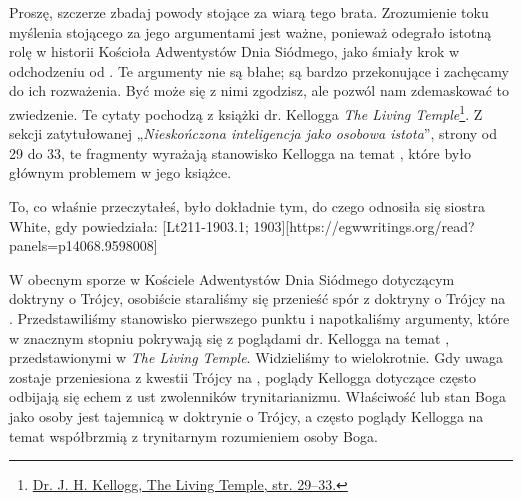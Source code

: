 Proszę, szczerze zbadaj powody stojące za wiarą tego brata. Zrozumienie toku myślenia stojącego za jego argumentami jest ważne, ponieważ odegrało istotną rolę w historii Kościoła Adwentystów Dnia Siódmego, jako śmiały krok w odchodzeniu od . Te argumenty nie są błahe; są bardzo przekonujące i zachęcamy do ich rozważenia. Być może się z nimi zgodzisz, ale pozwól nam zdemaskować to zwiedzenie. Te cytaty pochodzą z książki dr. Kellogga \textit{The Living Temple}\footnote{\href{https://archive.org/details/J.H.Kellogg.TheLivingTemple1903}{Dr. J. H. Kellogg, The Living Temple, str. 29--33.}}. Z sekcji zatytułowanej „\textit{Nieskończona inteligencja jako osobowa istota}”, strony od 29 do 33, te fragmenty wyrażają stanowisko Kellogga na temat , które było głównym problemem w jego książce.

To, co właśnie przeczytałeś, było dokładnie tym, do czego odnosiła się siostra White, gdy powiedziała: [Lt211-1903.1; 1903][https://egwwritings.org/read?panels=p14068.9598008]

W obecnym sporze w Kościele Adwentystów Dnia Siódmego dotyczącym doktryny o Trójcy, osobiście staraliśmy się przenieść spór z doktryny o Trójcy na . Przedstawiliśmy stanowisko pierwszego punktu  i napotkaliśmy argumenty, które w znacznym stopniu pokrywają się z poglądami dr. Kellogga na temat , przedstawionymi w \textit{The Living Temple}. Widzieliśmy to wielokrotnie. Gdy uwaga zostaje przeniesiona z kwestii Trójcy na , poglądy Kellogga dotyczące  często odbijają się echem z ust zwolenników trynitarianizmu. Właściwość lub stan Boga jako osoby jest tajemnicą w doktrynie o Trójcy, a często poglądy Kellogga na temat  współbrzmią z trynitarnym rozumieniem osoby Boga.

